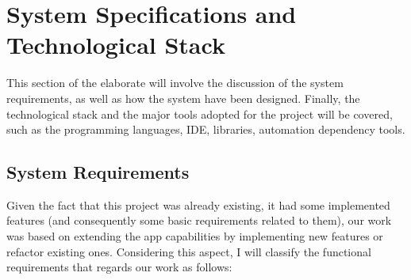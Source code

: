 \newpage
\section{System Specifications and Technological Stack}
This section of the elaborate will involve the discussion of the system requirements, as well as how the system have been designed. Finally, the technological stack and the major tools adopted for the project will be covered, such as the programming languages, IDE, libraries, automation dependency tools.
\subsection{System Requirements}
Given the fact that this project was already existing, it had some implemented features (and consequently some basic requirements related to them), our work was based on extending the app capabilities by implementing new features or refactor existing ones. \newline Considering this aspect, I will classify the functional requirements that regards our work as follows:
% 
%     
